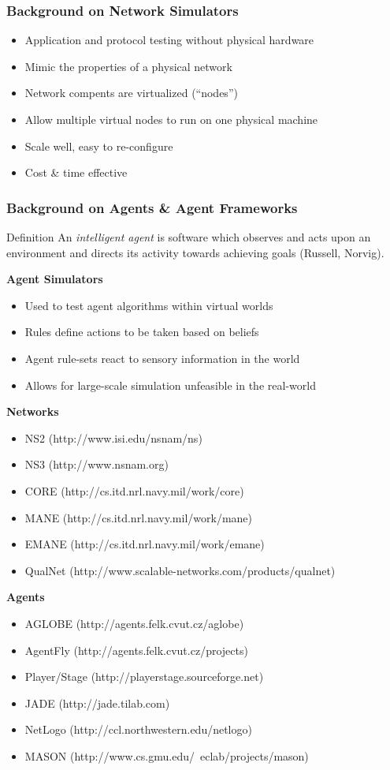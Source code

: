 \documentclass[mathserif,usenames,dvipsnames]{beamer}
\begin{document}
\frame
{
    \frametitle{Background on Network Simulators}
    \begin{itemize}
        \item Application and protocol testing without physical hardware
        \item Mimic the properties of a physical network
        \item Network compents are virtualized (``nodes'') 
        \item Allow multiple virtual nodes to run on one physical machine
        \item Scale well, easy to re-configure
        \item Cost \& time effective
    \end{itemize}
}

\frame
{
    \frametitle{Background on Agents \& Agent Frameworks}
    \begin{block}{Definition}
    An \emph{intelligent agent} is software which observes and acts upon an environment and directs its activity towards achieving goals (Russell, Norvig).
    \end{block}

    \textbf{Agent Simulators}
    \begin{itemize}
        \item Used to test agent algorithms within virtual worlds
        \item Rules define actions to be taken based on beliefs
        \item Agent rule-sets react to sensory information in the world
        \item Allows for large-scale simulation unfeasible in the real-world
    \end{itemize}
}

\frame
{
    \footnotesize
    \textbf{Networks}
    \begin{itemize}
        \item NS2 (http://www.isi.edu/nsnam/ns)
        \item NS3 (http://www.nsnam.org)
        \item CORE (http://cs.itd.nrl.navy.mil/work/core)
        \item MANE (http://cs.itd.nrl.navy.mil/work/mane)
        \item EMANE (http://cs.itd.nrl.navy.mil/work/emane)
        \item QualNet (http://www.scalable-networks.com/products/qualnet)
    \end{itemize}

    \textbf{Agents}
    \begin{itemize}
        \item AGLOBE (http://agents.felk.cvut.cz/aglobe)
        \item AgentFly (http://agents.felk.cvut.cz/projects)
        \item Player/Stage (http://playerstage.sourceforge.net)
        \item JADE (http://jade.tilab.com)
        \item NetLogo (http://ccl.northwestern.edu/netlogo)
        \item MASON (http://www.cs.gmu.edu/~eclab/projects/mason)
    \end{itemize}
}
\end{document}
